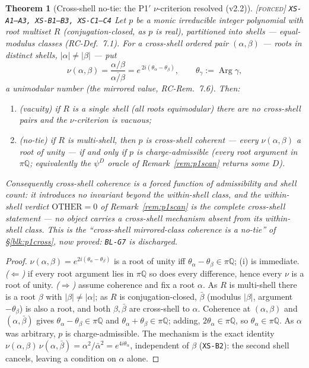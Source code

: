 \documentclass[11pt]{article}
\newcommand{\tagF}{\textcolor{cF}{\textsc{[forced]}}}
\newcommand{\hx}[1]{\textcolor{cC}{\footnotesize\texttt{#1}}}
\newcommand{\Q}{\mathbb{Q}}
\DeclareMathOperator{\Arg}{Arg}
\theoremstyle{plain}
\newtheorem{theorem}{Theorem}[section]
\theoremstyle{definition}
\theoremstyle{remark}
\begin{document}
\begin{theorem}[Cross-shell no-tie: the {P1$'$} $\nu$-criterion resolved (v2.2)]\label{thm:crossnotie}\tagF{} \hx{XS-A1--A3, XS-B1--B3, XS-C1--C4}
Let $p$ be a monic irreducible integer polynomial with root multiset $R$
(conjugation-closed, as $p$ is real), partitioned into \emph{shells} ---
equal-modulus classes (RC-Def.\ 7.1). For a \emph{cross-shell} ordered pair
$(\alpha,\beta)$ --- roots in distinct shells, $|\alpha|\neq|\beta|$ --- put
\[
\nu(\alpha,\beta)=\frac{\alpha/\beta}{\overline{\alpha/\beta}}
=e^{\,2i(\theta_\alpha-\theta_\beta)},\qquad
\theta_\gamma:=\Arg\gamma,
\]
a unimodular number (the mirrored value, RC-Rem.\ 7.6). Then:
\begin{enumerate}[nosep,label=(\roman*),leftmargin=2.2em]
\item \emph{(vacuity)} if $R$ is a single shell (all roots equimodular) there are
no cross-shell pairs and the $\nu$-criterion is vacuous;
\item \emph{(no-tie)} if $R$ is multi-shell, then $p$ is \emph{cross-shell
coherent} --- every $\nu(\alpha,\beta)$ a root of unity --- \emph{if and only if}
$p$ is \emph{charge-admissible} (every root argument in $\pi\Q$; equivalently the
$\psi^D$ oracle of Remark~\ref{rem:p1scan} returns some $D$).
\end{enumerate}
Consequently cross-shell coherence is a \emph{forced function} of admissibility
and shell count: it introduces no invariant beyond the within-shell class, and
the within-shell verdict $\mathrm{OTHER}=0$ of Remark~\ref{rem:p1scan} is the
complete cross-shell statement --- no object carries a cross-shell mechanism
absent from its within-shell class. This is the ``cross-shell mirrored-class
coherence is a no-tie'' of \S\ref{blk:p1cross}, now \emph{proved}: \hx{BL-G7} is
discharged.
\end{theorem}

\begin{proof}
$\nu(\alpha,\beta)=e^{2i(\theta_\alpha-\theta_\beta)}$ is a root of unity iff
$\theta_\alpha-\theta_\beta\in\pi\Q$; (i) is immediate. \emph{($\Leftarrow$)} if
every root argument lies in $\pi\Q$ so does every difference, hence every $\nu$ is
a root of unity. \emph{($\Rightarrow$)} assume coherence and fix a root $\alpha$.
As $R$ is multi-shell there is a root $\beta$ with $|\beta|\neq|\alpha|$; as $R$
is conjugation-closed, $\bar\beta$ (modulus $|\beta|$, argument $-\theta_\beta$)
is also a root, and both $\beta,\bar\beta$ are cross-shell to $\alpha$. Coherence
at $(\alpha,\beta)$ and $(\alpha,\bar\beta)$ gives
$\theta_\alpha-\theta_\beta\in\pi\Q$ and $\theta_\alpha+\theta_\beta\in\pi\Q$;
adding, $2\theta_\alpha\in\pi\Q$, so $\theta_\alpha\in\pi\Q$. As $\alpha$ was
arbitrary, $p$ is charge-admissible. The mechanism is the exact identity
$\nu(\alpha,\beta)\,\nu(\alpha,\bar\beta)=\alpha^2/\bar\alpha^2=e^{4i\theta_\alpha}$,
independent of $\beta$ (\hx{XS-B2}): the second shell cancels, leaving a condition
on $\alpha$ alone.
\end{proof}
\end{document}
